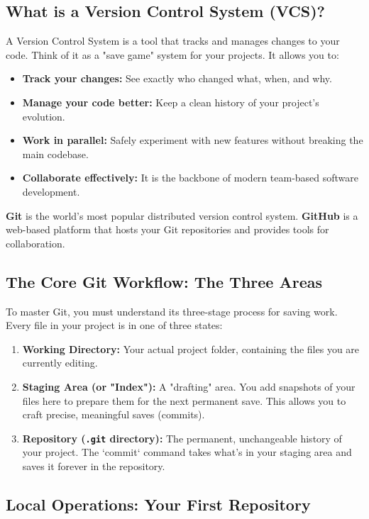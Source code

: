 \documentclass[11pt, a4paper]{article}
\begin{document}
\subsection{What is a Version Control System (VCS)?}
A Version Control System is a tool that tracks and manages changes to your code. Think of it as a "save game" system for your projects. It allows you to:
\begin{itemize}
    \item \textbf{Track your changes:} See exactly who changed what, when, and why.
    \item \textbf{Manage your code better:} Keep a clean history of your project's evolution.
    \item \textbf{Work in parallel:} Safely experiment with new features without breaking the main codebase.
    \item \textbf{Collaborate effectively:} It is the backbone of modern team-based software development.
\end{itemize}
\textbf{Git} is the world's most popular distributed version control system. \textbf{GitHub} is a web-based platform that hosts your Git repositories and provides tools for collaboration.

\subsection{The Core Git Workflow: The Three Areas}
To master Git, you must understand its three-stage process for saving work. Every file in your project is in one of three states:
\begin{enumerate}
    \item \textbf{Working Directory:} Your actual project folder, containing the files you are currently editing.
    \item \textbf{Staging Area (or "Index"):} A "drafting" area. You add snapshots of your files here to prepare them for the next permanent save. This allows you to craft precise, meaningful saves (commits).
    \item \textbf{Repository (\texttt{.git} directory):} The permanent, unchangeable history of your project. The `commit` command takes what's in your staging area and saves it forever in the repository.
\end{enumerate}

\subsection{Local Operations: Your First Repository}
\end{document}

